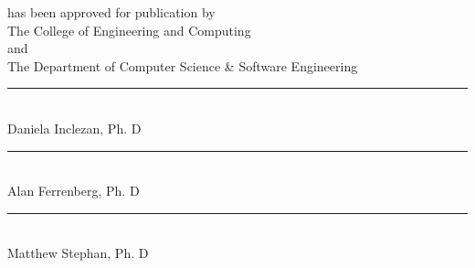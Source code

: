\documentclass[12pt, oneside]{book2}
\newcommand{\thesisAdvisor}{Daniela Inclezan, Ph. D}
\newcommand{\thesisFirstReader}{Alan Ferrenberg, Ph. D}
\newcommand{\thesisSecondReader}{Matthew Stephan, Ph. D}
\theoremstyle{definition}
\begin{document}
\begin{titlepage}
\begin{center}
    has been approved for publication by\\
    \vspace{0.75cm}
    The College of Engineering and Computing\\
    \vspace{0.5cm}
    and\\
    \vspace{0.5cm}
    The Department of Computer Science \& Software Engineering\\

    \vspace{1.5cm}

    \rule[-0.1cm]{8cm}{0.01cm} \\
    \thesisAdvisor \\

    \vspace{1.0cm}

    \rule[-0.1cm]{8cm}{0.01cm} \\
    \thesisFirstReader \\

    \vspace{1.0cm}

    \rule[-0.1cm]{8cm}{0.01cm} \\
    \thesisSecondReader \\

\end{center}
\thispagestyle{empty}
\end{titlepage}

\singlespacing
\setcounter{page}{3}

\tableofcontents
\setcounter{tocdepth}{2}
\cleardoublepage

\listoftables
\cleardoublepage

\listoffigures

\newpage



\mainmatter










\appendix




\backmatter



\end{document}
